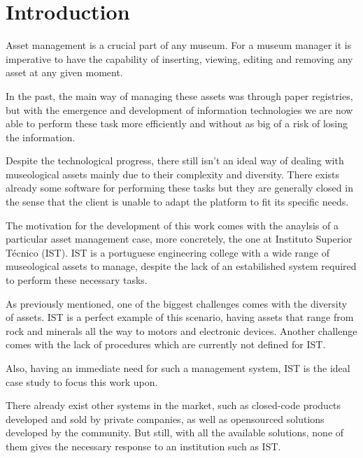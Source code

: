 
\section{Introduction}
\label{Introduction}

Asset management is a crucial part of any museum. For a museum manager it is imperative to have the capability of inserting, viewing, editing and removing any asset at any given moment.


In the past, the main way of managing these assets was through paper registries, but with the emergence and development of information technologies we are now able to perform these task more efficiently and without as big of a risk of losing the information.

Despite the technological progress, there still isn't an ideal way of dealing with museological assets mainly due to their complexity and diversity. There exists already some software for performing these tasks but they are generally closed in the sense that the client is unable to adapt the platform to fit its specific needs.


The motivation for the development of this work comes with the anaylsis of a particular asset management case, more concretely, the one at Instituto Superior Técnico (IST). IST is a portuguese engineering college with a wide range of museological assets to manage, despite the lack of an estabilished system required to perform these necessary tasks.


As previously mentioned, one of the biggest challenges comes with the diversity of assets. IST is a perfect example of this scenario, having assets that range from rock and minerals all the way to motors and electronic devices. Another challenge comes with the lack of procedures which are currently not defined for IST.


Also, having an immediate need for such a management system, IST is the ideal case study to focus this work upon.


There already exist other systems in the market, such as closed-code products developed and sold by private companies, as well as opensourced solutions developed by the community. But still, with all the available solutions, none of them gives the necessary response to an institution such as IST.
